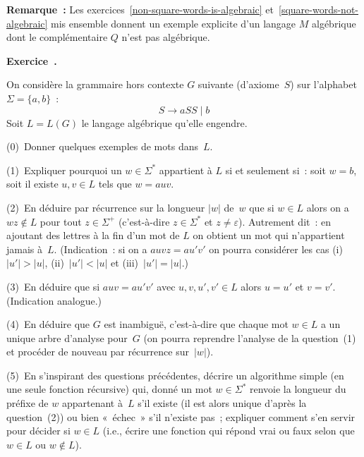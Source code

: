 \documentclass[12pt,a4paper]{article}
\theoremstyle{definition}
\newcommand\exercice{%
\refstepcounter{comcnt}\bigskip\noindent\textbf{Exercice~\thecomcnt.}}
\begin{document}
\textbf{Remarque :} Les exercices \ref{non-square-words-is-algebraic}
et \ref{square-words-not-algebraic} mis ensemble donnent un exemple
explicite d'un langage $M$ algébrique dont le complémentaire $Q$ n'est
pas algébrique.

%

\exercice

On considère la grammaire hors contexte $G$ suivante (d'axiome $S$)
sur l'alphabet $\Sigma = \{a,b\}$ :
\[
S \rightarrow aSS \;|\; b
\]
Soit $L = L(G)$ le langage algébrique qu'elle engendre.

(0) Donner quelques exemples de mots dans $L$.

(1) Expliquer pourquoi un $w\in \Sigma^*$ appartient à $L$ si et
seulement si : soit $w = b$, soit il existe $u,v\in L$ tels que $w =
auv$.

(2) En déduire par récurrence sur la longueur $|w|$ de $w$ que si $w
\in L$ alors on a $wz \not\in L$ pour tout $z \in \Sigma^+$
(c'est-à-dire $z \in \Sigma^*$ et $z \neq \varepsilon$).  Autrement
dit : en ajoutant des lettres à la fin d'un mot de $L$ on obtient un
mot qui n'appartient jamais à $L$.  (Indication : si on a $auvz =
au'v'$ on pourra considérer les cas (i) $|u'|>|u|$, (ii) $|u'|<|u|$ et
(iii) $|u'|=|u|$.)

(3) En déduire que si $auv = au'v'$ avec $u,v,u',v'\in L$ alors $u=u'$
et $v=v'$.  (Indication analogue.)

(4) En déduire que $G$ est inambiguë, c'est-à-dire que chaque mot
$w\in L$ a un unique arbre d'analyse pour $G$ (on pourra reprendre
l'analyse de la question (1) et procéder de nouveau par récurrence
sur $|w|$).

(5) En s'inspirant des questions précédentes, décrire un algorithme
simple (en une seule fonction récursive) qui, donné un mot
$w\in\Sigma^*$ renvoie la longueur du préfixe de $w$ appartenant à $L$
s'il existe (il est alors unique d'après la question (2)) ou bien
« échec » s'il n'existe pas ; expliquer comment s'en servir pour
décider si $w\in L$ (i.e., écrire une fonction qui répond vrai ou faux
selon que $w\in L$ ou $w\not\in L$).
\end{document}
